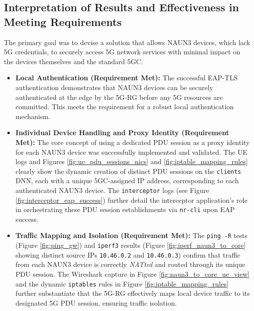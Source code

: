 \subsection{Interpretation of Results and Effectiveness in Meeting Requirements}

The primary goal was to devise a solution that allows \ac{NAUN3} devices, which lack \ac{5G} credentials, to securely access \ac{5G} network services with minimal impact on the devices themselves and the standard \ac{5GC}.

\begin{itemize}
    \item \textbf{Local Authentication (Requirement Met):} The successful \ac{EAP-TLS} authentication demonstrates that \ac{NAUN3} devices can be securely authenticated at the edge by the \ac{5G-RG} before any \ac{5G} resources are committed. This meets the requirement for a robust local authentication mechanism.

    \item \textbf{Individual Device Handling and Proxy Identity (Requirement Met):} The core concept of using a dedicated \ac{PDU} session as a proxy identity for each \ac{NAUN3} device was successfully implemented and validated. The \ac{UE} logs and Figures \ref{fig:ue_pdu_sessions_nics} and \ref{fig:iptable_mapping_rules} clearly show the dynamic creation of distinct \ac{PDU} sessions on the \texttt{clients} \ac{DNN}, each with a unique \ac{5GC}-assigned \ac{IP} address, corresponding to each authenticated \ac{NAUN3} device. The \texttt{interceptor} logs (see Figure \ref{fig:interceptor_eap_success}) further detail the interceptor application's role in orchestrating these \ac{PDU} session establishments via \texttt{nr-cli} upon \ac{EAP} success.

    \item \textbf{Traffic Mapping and Isolation (Requirement Met):} The \texttt{ping -R} tests (Figure \ref{fig:ping_gw}) and \texttt{iperf3} results (Figure \ref{fig:iperf_naun3_to_core} showing distinct source \acp{IP} \texttt{10.46.0.2} and \texttt{10.46.0.3}) confirm that traffic from each \ac{NAUN3} device is correctly \textit{NATted} and routed through its unique \ac{PDU} session. The Wireshark capture in Figure \ref{fig:naun3_to_core_ue_view} and the dynamic \texttt{iptables} rules in Figure \ref{fig:iptable_mapping_rules} further substantiate that the \ac{5G-RG} effectively maps local device traffic to its designated \ac{5G} \ac{PDU} session, ensuring traffic isolation.


\end{itemize}
